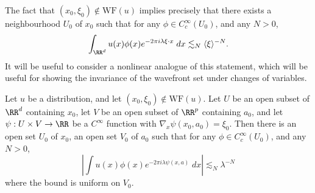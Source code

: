 The fact that $(x_0,\xi_0) \not \in \text{WF}(u)$ implies precisely that there exists a neighbourhood $U_0$ of $x_0$ such that for any $\phi \in C_c^\infty(U_0)$, and any $N > 0$,
%
\[ \int_{\RR^d} u(x) \phi(x) e^{-2 \pi i \lambda \xi \cdot x}\; dx \lesssim_N \langle \xi \rangle^{-N}. \]
%
It will be useful to consider a nonlinear analogue of this statement, which will be useful for showing the invariance of the wavefront set under changes of variables.

\begin{theorem}
    Let $u$ be a distribution, and let $(x_0,\xi_0) \not \in \text{WF}(u)$. Let $U$ be an open subset of $\RR^d$ containing $x_0$, let $V$ be an open subset of $\RR^p$ containing $a_0$, and let $\psi: U \times V \to \RR$ be a $C^\infty$ function with $\nabla_x \psi(x_0,a_0) = \xi_0$. Then there is an open set $U_0$ of $x_0$, an open set $V_0$ of $a_0$ such that for any $\phi \in C_c^\infty(U_0)$, and any $N > 0$,
    \[ \left| \int u(x) \phi(x) e^{-2 \pi i \lambda \psi(x,a)}\; dx \right| \lesssim_N \lambda^{-N} \]
    where the bound is uniform on $V_0$.
\end{theorem}

